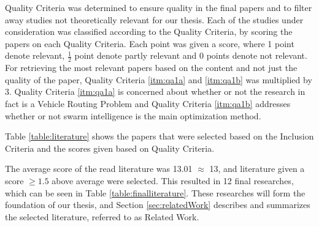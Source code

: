 Quality Criteria was determined to ensure quality in the final papers and to filter away studies not theoretically relevant for our thesis. Each of the studies under consideration was classified according to the Quality Criteria, by scoring the papers on each Quality Criteria. Each point was given a score, where 1 point denote relevant, $\frac{1}{2}$ point denote partly relevant and 0 points denote not relevant. For retrieving the most relevant papers based on the content and not just the quality of the paper, Quality Criteria \ref{itm:qa1a} and \vref{itm:qa1b} was multiplied by 3. Quality Criteria \ref{itm:qa1a} is concerned about whether or not the research in fact is a Vehicle Routing Problem and Quality Criteria \ref{itm:qa1b} addresses whether or not swarm intelligence is the main optimization method. 

Table \vref{table:literature} shows the papers that were selected based on the Inclusion Criteria and the scores given based on Quality Criteria.

The average score of the read literature was 13.01 $\approx$ 13, and literature given a score $\geq{1.5}$ above average were selected. This resulted in 12 final researches, which can be seen in Table \vref{table:finalliterature}. These researches will form the foundation of our thesis, and Section \vref{sec:relatedWork} describes and summarizes the selected literature, referred to as Related Work. 
